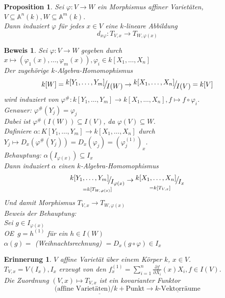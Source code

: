 \documentclass[a4paper,12pt]{report}
\theoremstyle{break}
\newtheorem{Prop}[Def]{Proposition}
\theoremstyle{nonumberbreak}
\newtheorem{nnErinn}{Erinnerung}
\newtheorem{Bew}{Beweis}
\theoremstyle{nonumberplain}
\newcommand{\A}{\mathbb{A}}
\newcommand{\FakRaum}[2]{
  \raisebox{0.7ex}{\ensuremath{#1}}
  \ensuremath{\mkern-3mu}\big/\ensuremath{\mkern-3mu}
  \raisebox{-0.6ex}{\ensuremath{#2}}}
\renewcommand{\OE}{O\!\!E~}
\begin{document}
\begin{Prop}
Sei $\varphi:V\to W$ ein Morphismus affiner Variet\"aten, $V\subseteq \A^n(k), W\subseteq \A^m(k)$.\\
Dann induziert $\varphi$ f\"ur jedes $x\in V$ eine $k$-lineare Abbildung
	\[ d_{x\varphi}: T_{V,x}\to T_{W,\varphi(x)} \]
\end{Prop}

\begin{Bew}
Sei $\varphi:V\to W$ gegeben durch $x\mapsto(\varphi_1(x),\ldots ,\varphi_m(x)), \varphi_i\in k[X_1,\ldots ,X_n]$\\
Der zugeh\"orige $k$-Algebra-Homomophismus
	\[k[W]=\FakRaum{k[Y_1,\ldots ,Y_m]}{I(W)}\to \FakRaum{k[X_1,\ldots ,X_n]}{I(V)}=k[V]\]
wird induziert von $\varphi^\#:k[Y_1,\ldots ,Y_m]\to k[X_1,\ldots ,X_n], f\mapsto f\circ \varphi_i$.\\
Genauer: $\varphi^\#(Y_j)=\varphi_j$\\
Dabei ist $\varphi^\#(I(W))\subseteq I(V)$, da $\varphi(V)\subseteq W$.\\
Dafiniere $\alpha: K[Y_1,\ldots ,Y_m]\to k[X_1,\ldots ,X_n]$ durch $Y_j\mapsto D_x(\varphi^\#(Y_j))=D_x(\varphi_j)=(\varphi_j^{(1)})_x$.\\
\emph{Behauptung:} $\alpha(I_{\varphi(x)})\subseteq I_x$\\
Dann induziert $\alpha$ einen $k$-Algebra-Homomophismus
	\[ \underset{=k[T_{W,\varphi(x)}]}{\FakRaum{k[Y_1,\ldots ,Y_m]}{I_{\varphi(x)}}} \to \underset{=k[T_{V,x}]}{\FakRaum{k[X_1,\ldots ,X_n]}{I_x}} \]
Und damit Morphismus $T_{V,x}\to T_{W,\varphi(x)}$\\
\emph{Beweis der Behauptung:}\\
Sei $g\in I_{\varphi(x)}$\\
\OE $g=h^{(1)}$ f\"ur ein $h\in I(W)$\\
$\alpha(g) =$ (Weihnachtsrechnung) $= D_x(g\circ \varphi)\in I_x$
\end{Bew}

\begin{nnErinn}
$V$ affine Variet\"at \"uber einem K\"orper $k$, $x\in V$.\\
$T_{V,x} =V(I_x), I_x$ erzeugt von den $f_x^{(1)}=\sum\limits_{i=1}^n\frac{\partial f}{\partial X_i}(x)X_i, f\in I(V)$.\\
Die Zuordnung $(V,x)\mapsto T_{V,x}$ ist ein kovarianter Funktor
	\[ \underline{\text{(affine Variet\"aten)}/k + \text{Punkt}} \to \underline{k\text{-Vektorr\"aume}}\]
\end{nnErinn}
\end{document}
